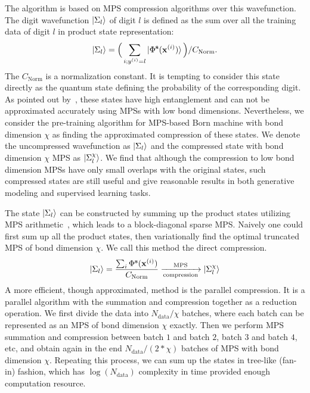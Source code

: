 \documentclass[nonatbib]{article}
\newcommand{\citet}{\cite}
\newcommand{\citep}{\cite}
\begin{document}
   

    
The algorithm is based on MPS compression algorithms over this wavefunction.
The digit wavefunction $\ket{\Sigma_l}$ of digit $l$ is defined as the sum over all the training data of digit $l$ in product state representation:
\begin{equation}
    \ket{\Sigma_l} = \Big( \sum_{i; y^{(i)}=l} \ket{\Phi^{\bf s}({\bf x}^{(i)})} \Big) / C_\text{Norm} .
\end{equation}
The $C_\text{Norm}$ is a normalization constant.
It is tempting to consider this state directly as the quantum state defining the probability of the corresponding digit.
As pointed out by~\citet{martyn2020entanglement}, these states have high entanglement and can not be approximated accurately using MPSs with low bond dimensions.
Nevertheless, we consider the pre-training algorithm for MPS-based Born machine with bond dimension $\chi$ as finding the approximated compression of these states.
We denote the uncompressed wavefunction as $\ket{\Sigma_l}$ and the compressed state with bond dimension $\chi$ MPS as $\ket{\Sigma_l^{\chi}}$.
We find that although the compression to low bond dimension MPSs have only small overlaps with the original states, such compressed states are still useful and give reasonable results in both generative modeling and supervised learning tasks.
    
    

The state $\ket{\Sigma_l}$ can be constructed by summing up the product states utilizing MPS arithmetic~\citep{schollwock2011density}, which leads to a block-diagonal sparse MPS.
Naively one could first sum up all the product states, then variationally find the optimal truncated MPS of bond dimension $\chi$. We call this method the direct compression.
\begin{equation}
    \ket{\Sigma_l} = \frac{\sum_{i} \Phi^{\bf s}({\bf x}^{(i)})}{C_\text{Norm}}
    \xrightarrow[\text{compression}]{\text{MPS}} \ket{\Sigma_l^{\chi}}
\end{equation}
A more efficient, though approximated, method is the parallel compression.
It is a parallel algorithm with the summation and compression together as a reduction operation.
We first divide the data into $N_\text{data}/\chi$ batches, where each batch can be represented as an MPS of bond dimension $\chi$ exactly.
Then we perform MPS summation and compression between batch $1$ and batch $2$, batch $3$ and batch $4$, etc, and obtain again in the end $N_\text{data}/(2*\chi)$ batches of MPS with bond dimension $\chi$.
Repeating this process, we can sum up the states in tree-like (fan-in) fashion, which has $\log(N_\text{data})$ complexity in time provided enough computation resource.
\end{document}
